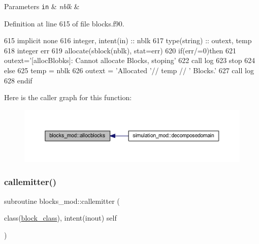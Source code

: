 \begin{DoxyParams}[1]{Parameters}
\mbox{\tt in}  & {\em nblk} & \\
\hline
\end{DoxyParams}


Definition at line 615 of file blocks.\+f90.


\begin{DoxyCode}
615     \textcolor{keywordtype}{implicit none}
616     \textcolor{keywordtype}{integer}, \textcolor{keywordtype}{intent(in)} ::  nblk
617     \textcolor{keywordtype}{type}(string) :: outext, temp
618     \textcolor{keywordtype}{integer} err
619     \textcolor{keyword}{allocate}(sblock(nblk), stat=err)
620     \textcolor{keywordflow}{if}(err/=0)\textcolor{keywordflow}{then}
621         outext=\textcolor{stringliteral}{'[allocBlobks]: Cannot allocate Blocks, stoping'}
622         \textcolor{keyword}{call }log%
623         stop
624     \textcolor{keywordflow}{else}
625         temp = nblk
626         outext = \textcolor{stringliteral}{'Allocated '}// temp // \textcolor{stringliteral}{' Blocks.'}
627         \textcolor{keyword}{call }log%
628 \textcolor{keywordflow}{    endif}
\end{DoxyCode}
Here is the caller graph for this function\+:\nopagebreak
\begin{figure}[H]
\begin{center}
\leavevmode
\includegraphics[width=350pt]{namespaceblocks__mod_a639beb0fee2290d46353f4b4702d6711_icgraph}
\end{center}
\end{figure}
\mbox{\label{namespaceblocks__mod_a2c3cf5113e1422d812c2c869afde2729}} 
\subsubsection{\texorpdfstring{callemitter()}{callemitter()}}
{\footnotesize\ttfamily subroutine blocks\+\_\+mod\+::callemitter (\begin{DoxyParamCaption}\item[{class(\mbox{\hyperlink{structblocks__mod_1_1block__class}{block\+\_\+class}}), intent(inout)}]{self }\end{DoxyParamCaption})\hspace{0.3cm}{\ttfamily [private]}}



